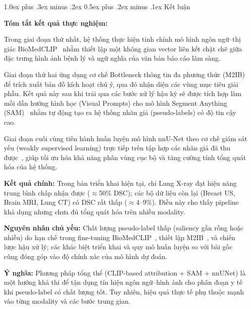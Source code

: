 \documentclass[conference]{IEEEtran}
\makeatletter
\def\section{\@startsection{section}{1}{\z@}%
  {1.0ex plus .3ex minus .2ex}%
  {0.5ex plus .2ex minus .1ex}%
  {\reset@font\normalsize\bfseries\centering}}%
\makeatother
\begin{document}
\section{Kết luận}
\label{sec:ketluan}

\textbf{Tóm tắt kết quả thực nghiệm:}

Trong giai đoạn thứ nhất, hệ thống thực hiện tinh chỉnh mô hình ngôn ngữ--thị giác BioMedCLIP~\cite{ref3} nhằm thiết lập một không gian vector liên kết chặt chẽ giữa đặc trưng hình ảnh bệnh lý và ngữ nghĩa của văn bản báo cáo lâm sàng.

Giai đoạn thứ hai ứng dụng cơ chế Bottleneck thông tin đa phương thức (M2IB)~\cite{ref7} để trích xuất bản đồ kích hoạt chú ý, qua đó nhận diện các vùng mục tiêu giải phẫu. Kết quả này sau khi trải qua các bước xử lý hậu kỳ sẽ được tích hợp làm mồi dẫn hướng hình học (Visual Prompts) cho mô hình Segment Anything (SAM)~\cite{ref2,ref4} nhằm tự động tạo ra hệ thống nhãn giả (pseudo-labels) có độ tin cậy cao.

Giai đoạn cuối cùng tiến hành huấn luyện mô hình nnU-Net theo cơ chế giám sát yếu (weakly supervised learning) trực tiếp trên tập hợp các nhãn giả đã thu được~\cite{ref1}, giúp tối ưu hóa khả năng phân vùng cục bộ và tăng cường tính tổng quát hóa của hệ thống.

\textbf{Kết quả chính:} Trong bản triển khai hiện tại, chỉ Lung X-ray đạt hiệu năng trung bình chấp nhận được ($\approx$50\% DSC); các bộ dữ liệu còn lại (Breast US, Brain MRI, Lung CT) có DSC rất thấp ($\approx$4--9\%). Điều này cho thấy pipeline khả dụng nhưng chưa đủ tổng quát hóa trên nhiều modality.

\textbf{Nguyên nhân chủ yếu:} Chất lượng pseudo-label thấp (saliency gần rỗng hoặc nhiễu) do hạn chế trong fine-tuning BioMedCLIP~\cite{ref3}, thiết lập M2IB~\cite{ref7}, và chiến lược hậu xử lý; các khác biệt triển khai và quy mô huấn luyện so với bài gốc~\cite{ref1} cũng đóng góp vào độ chính xác của mô hình dự đoán.

\textbf{Ý nghĩa:} Phương pháp tổng thể (CLIP-based attribution + SAM + nnUNet) là một hướng khả thi để tận dụng tín hiệu ngôn ngữ--hình ảnh cho phân đoạn y tế khi pseudo-label có chất lượng tốt. Tuy nhiên, hiệu quả thực tế phụ thuộc mạnh vào từng modality và các bước trung gian.


\end{document}
